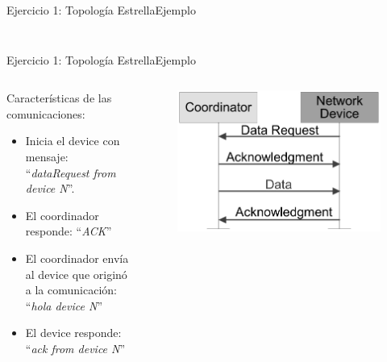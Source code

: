 \documentclass[aspectratio=169,handout]{beamer}
\begin{document}
\begin{frame}[t]{Ejercicio 1: Topología Estrella}{Ejemplo}
\begin{columns}[t]
\begin{column}{.5\textwidth}
\begin{minipage}[t][0.7\textheight][s]{\columnwidth}
\begin{figure}[H]
            \end{figure}            
        \end{minipage}
    \end{column}
\end{columns}          
\end{frame}

\begin{frame}[t]{Ejercicio 1: Topología Estrella}{Ejemplo}
\begin{columns}[t]
    \begin{column}{.5\textwidth}
        \begin{minipage}[t][0.7\textheight][s]{\columnwidth}
        Características de las comunicaciones:
        \vspace{10px}
		\begin{itemize}
			\item Inicia el device con mensaje: 
			``\textit{dataRequest from device N}''.
			\vspace{5px}			
			\item El coordinador responde: ``\textit{ACK}''
			\vspace{5px}
			\item El coordinador envía al device que originó a la comunicación: ``\textit{hola device N}''
			\vspace{5px}
			\item El device responde:\\``\textit{ack from device N}''
            \end{itemize}        
            \end{minipage}
    \end{column}
    \begin{column}{.5\textwidth}
        \begin{minipage}[t][0.7\textheight][s]{\columnwidth}
            \begin{figure}[H]
                \includegraphics[height=.5\textheight]{./imagenes/coord-dev-sinbeacon.jpg}

\end{figure}
\end{minipage}
\end{column}
\end{columns}
\end{frame}
\end{document}
